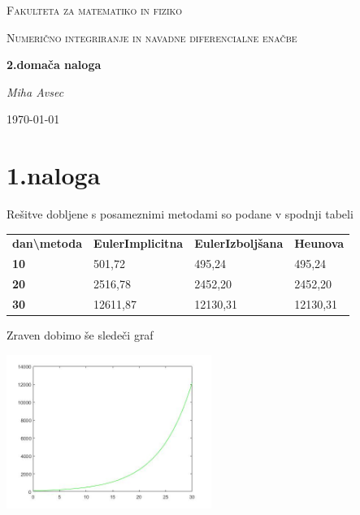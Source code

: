 \documentclass[11pt]{article} %
\begin{document}
\begin{titlepage}
\centering
{\scshape\LARGE Fakulteta za matematiko in fiziko \par}
\vspace{1cm}
{\scshape\Large Numerično integriranje in navadne diferencialne enačbe\par}
\vspace{1.5cm}
{\huge\bfseries 2.domača naloga\par}
\vspace{2cm}
{\Large\itshape Miha Avsec\par}
\vfill

\vfill

{\large \today\par}
\end{titlepage}


\section{1.naloga}

Rešitve dobljene s posameznimi metodami so podane v spodnji tabeli

\begin{table}[h]
\begin{tabular}{llll}
\textbf{dan\textbackslash{}metoda} & \textbf{EulerImplicitna} & \textbf{EulerIzboljšana} & \textbf{Heunova} \\
\textbf{10}                        & 501,72                   & 495,24                   & 495,24           \\
\textbf{20}                        & 2516,78                  & 2452,20                  & 2452,20          \\
\textbf{30}                        & 12611,87                 & 12130,31                 & 12130,31        
\end{tabular}
\end{table}

Zraven dobimo še sledeči graf

\includegraphics[width=0.5\textwidth]{naloga1.jpg}
\end{document}
